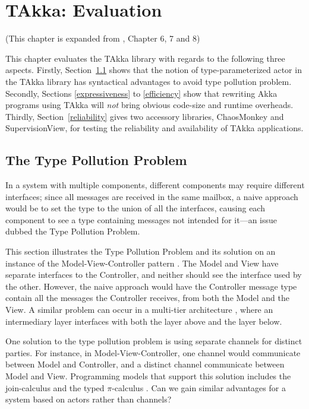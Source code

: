 \chapter{TAkka: Evaluation}
\label{takka_evaluation}

\begin{center}
(This chapter is expanded from \citep{TAKKA_paper}, Chapter 6, 7 and 8)
\end{center}
\vspace{12 pt}

This chapter evaluates the TAkka library with regards to the following three 
aspects.  Firstly, Section~\ref{type_pollution} shows that the notion of 
type-parameterized actor in the TAkka library has syntactical advantages to 
avoid type pollution problem.  Secondly, Sections 
\ref{expressiveness} to \ref{efficiency} show that rewriting Akka programs 
using TAkka will {\it not} bring obvious code-size and runtime overheads. 
 Thirdly, Section~\ref{reliability} gives two accessory libraries, ChaosMonkey 
and SupervisionView, for testing the reliability and availability of TAkka 
applications. 



\section{The Type Pollution Problem}
\label{type_pollution}

In a system with multiple components, different components may require
different interfaces; since all messages are received in the same
mailbox, a naive approach would be to set the type to the union of all
the interfaces, causing each component to see a type containing
messages not intended for it---an issue dubbed the Type Pollution
Problem.

This section illustrates the Type Pollution Problem and its solution on an
instance of the Model-View-Controller pattern \citep{reenskaug1979original, burbeck87}.  The Model
and View have separate interfaces to the Controller, and neither
should see the interface used by the other.  However, the naive
approach would have the Controller message type contain all the
messages the Controller receives, from both the Model and the View.
A similar problem can occur in a multi-tier architecture \citep{fowler2002patterns},
where an intermediary layer interfaces with both the layer above
and the layer below.

One solution to the type pollution problem is using separate channels
for distinct parties.  For instance, in Model-View-Controller, one
channel would communicate between Model and Controller, and a distinct
channel communicate between Model and View.  Programming models that
support this solution includes the join-calculus \citep{full_join} and
the typed $\pi$-calculus \citep{pi_book}.  Can we gain similar
advantages for a system based on actors rather than channels?

